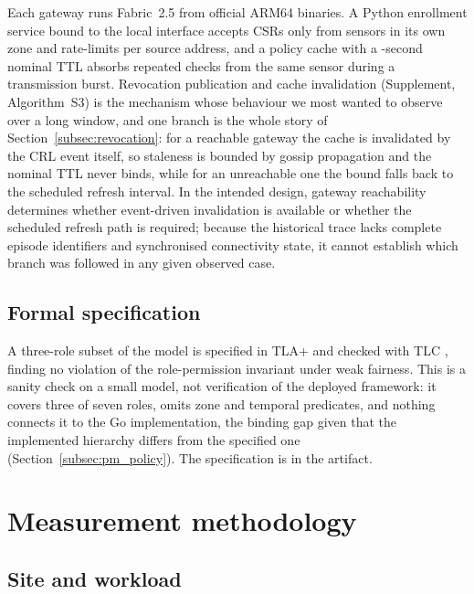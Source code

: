 \documentclass[a4paper,fleqn]{cas-dc}
\begin{document}
Each gateway runs Fabric~2.5 from official ARM64 binaries. A Python
enrollment service bound to the local interface accepts CSRs only from
sensors in its own zone and rate-limits per source address, and a policy
cache with a \RevCacheTTL-second nominal TTL absorbs repeated checks from
the same sensor during a transmission burst. Revocation publication and
cache invalidation (Supplement, Algorithm~S3) is the mechanism whose
behaviour we most wanted to observe over a long window, and one branch is
the whole story of Section~\ref{subsec:revocation}: for a reachable
gateway the cache is invalidated by the CRL event itself, so staleness is
bounded by gossip propagation and the nominal TTL never binds, while for an
unreachable one the bound falls back to the scheduled refresh interval.
In the intended design, gateway reachability determines whether
event-driven invalidation is available or whether the scheduled refresh
path is required; because the historical trace lacks complete episode
identifiers and synchronised connectivity state, it cannot establish
which branch was followed in any given observed case.

\subsection{Formal specification}
\label{subsec:tla}

A three-role subset of the model is specified in TLA+ and checked with TLC
\cite{lamport2002specifying,newcombe2015amazon}, finding no violation of
the role-permission invariant under weak fairness. This is a sanity check
on a small model, not verification of the deployed framework: it covers
three of seven roles, omits zone and temporal predicates, and nothing
connects it to the Go implementation, the binding gap given that the
implemented hierarchy differs from the specified one
(Section~\ref{subsec:pm_policy}). The specification is in the artifact.

\FloatBarrier
\section{Measurement methodology}
\label{sec:method}

\subsection{Site and workload}
\label{subsec:deployment}
\end{document}
